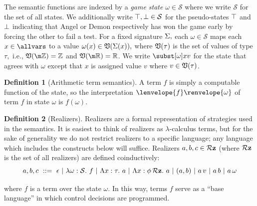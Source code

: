 \documentclass[12pt]{cmuthesis}
\theoremstyle{definition}
\newtheorem{definition}{Definition}
\theoremstyle{remark}
\newcommand{\bebecomes}{\mathrel{::=}}
\newcommand{\alternative}{~|~}
\newcommand{\allstate}{\mathcal{S}}
\newcommand{\om}{\omega}
\newcommand{\tint}[2]{\lenvelope{#1}\renvelope{#2}}
\begin{document}
The semantic functions are indexed by  a \emph{game state} $\om \in \allstate$ where we write $\allstate$ for the set of all states.
We additionally write $\stt, \sff \in \allstate$ for the pseudo-states $\top$ and $\bot$ indicating that Angel or Demon respectively has won the game early by forcing the other to fail a test.
For a fixed signature $\Sigma,$ each $\om \in \allstate$ maps each $x \in \allvars$ to a value $\om(x) \in \valset{\sig{x}},$ where $\mathfrak{V}(\tau)$ is the set of values of type $\tau,$ i.e., $\valset{\kwint} = \mathbb{Z}$ and $\valset{\kwreal} = \mathbb{R}$.
We write $\ssub{\om}{x}{v}$ for the state that agrees with $\om$ except that $x$ is assigned value $v$ where $v \in \mathfrak{V}(\tau)$.
\begin{definition}[Arithmetic term semantics]
\label{def:term-sem}
A term $f$ is simply a computable function of the state, so the interpretation $\tint{f}{\om}$ of term $f$ in state $\om$ is $f(\om)$.
\end{definition}
\begin{definition}[Realizers]
Realizers are a formal representation of strategies used in the semantics.
It is easiest to think of realizers as $\lambda$-calculus terms, but for the sake of generality we do not restrict realizers to a specific language;
any language which includes the constructs below will suffice.
Realizers $a,b,c \in \mathcal{R}\mathbf{z}$ (where $\mathcal{R}\mathbf{z}$ is the set of all realizers) are defined coinductively:
\[\aa,\ab,\ac ~\bebecomes~ \rzNil \alternative \rzBLam{\om}{f} \alternative \rzFOLam{x}{\tau}{\aa} \alternative \rzHOLam{x}{\phi}{\aa} \alternative \rzCons{\aa}{\ab}\alternative  \rzApp{\aa}{v} \alternative \rzApp{\aa}{\ab} \alternative \rzApp{\aa}{\om}\]
\end{definition}

where $f$ is a term over the state $\om$.
In this way, terms $f$ serve as a ``base language'' in which control  decisions are programmed.
\end{document}
